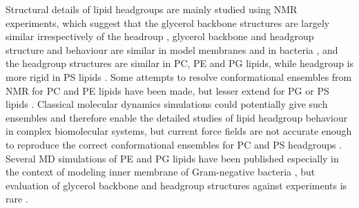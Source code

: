 \documentclass[aps,prl,superscriptaddress,twocolumn]{revtex4}
\begin{document}
Structural details of lipid headgroups are mainly studied using NMR experiments, which
suggest that the glycerol backbone structures are largely similar irrespectively of the headroup \cite{gally81}, 
glycerol backbone and headgroup structure and behaviour are similar in model membranes and in bacteria \cite{gally81,scherer87,seelig90},
and the headgroup structures are similar in PC, PE and PG lipids, while headgroup is more rigid in PS lipids \cite{wohlgemuth80,buldt81}. 
Some attempts to resolve conformational ensembles from NMR for PC and PE lipids have been made,
but lesser extend for PG or PS lipids \cite{seelig77c,davis83,Semchyschyn04}.
Classical molecular dynamics simulations could potentially give such ensembles and therefore enable
the detailed studies of lipid headgroup behaviour in complex biomolecular systems, but current
force fields are not accurate enough to reproduce the correct conformational ensembles for PC and PS headgroups \cite{botan15,antila19}.
Several MD simulations of PE and PG lipids have been published especially in the context of modeling
inner membrane of Gram-negative
bacteria \cite{devries04,murzyn05,pedersen06,zhao07,gurtovenko08,zhao08,henin09,kukol09,tsai12,dickson12,venable13,dickson14,berglund15}
,
but evaluation of glycerol backbone and headgroup structures against experiments is rare \cite{henin09}.
\end{document}
